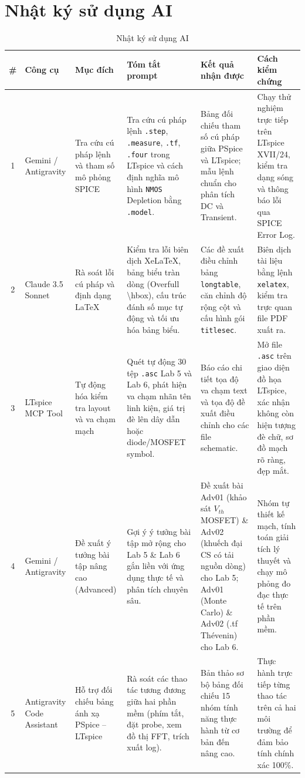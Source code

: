 \documentclass[12pt,a4paper]{article}
\newcommand{\hc}[1]{\cellcolor{navy}\color{white}\sffamily\bfseries\small #1}
\begin{document}
\section{Nhật ký sử dụng AI}

\begin{table}[H]\centering\small
\caption{Nhật ký sử dụng AI}\label{tab:ai_log}
\renewcommand{\arraystretch}{1.3}
\setlength{\tabcolsep}{3.5pt}
\begin{tabular}{|c|p{1.9cm}|p{2.5cm}|p{2.9cm}|p{2.9cm}|p{2.6cm}|}
\hline
\hc{\#} & \hc{Công cụ} & \hc{Mục đích} & \hc{Tóm tắt prompt} & \hc{Kết quả nhận được} & \hc{Cách kiểm chứng}\\ \hline
1 & Gemini / Antigravity & Tra cứu cú pháp lệnh và tham số mô phỏng SPICE & Tra cứu cú pháp lệnh \texttt{.step}, \texttt{.measure}, \texttt{.tf}, \texttt{.four} trong LTspice và cách định nghĩa mô hình \texttt{NMOS} Depletion bằng \texttt{.model}. & Bảng đối chiếu tham số cú pháp giữa PSpice và LTspice; mẫu lệnh chuẩn cho phân tích DC và Transient. & Chạy thử nghiệm trực tiếp trên LTspice XVII/24, kiểm tra dạng sóng và thông báo lỗi qua SPICE Error Log. \\ \hline
2 & Claude 3.5 Sonnet & Rà soát lỗi cú pháp và định dạng LaTeX & Kiểm tra lỗi biên dịch XeLaTeX, bảng biểu tràn dòng (Overfull \textbackslash hbox), cấu trúc đánh số mục tự động và tối ưu hóa bảng biểu. & Các đề xuất điều chỉnh bảng \texttt{longtable}, căn chỉnh độ rộng cột và cấu hình gói \texttt{titlesec}. & Biên dịch tài liệu bằng lệnh \texttt{xelatex}, kiểm tra trực quan file PDF xuất ra. \\ \hline
3 & LTspice MCP Tool & Tự động hóa kiểm tra layout và va chạm mạch & Quét tự động 30 tệp \texttt{.asc} Lab 5 và Lab 6, phát hiện va chạm nhãn tên linh kiện, giá trị đè lên dây dẫn hoặc diode/MOSFET symbol. & Báo cáo chi tiết tọa độ va chạm text và tọa độ đề xuất điều chỉnh cho các file schematic. & Mở file \texttt{.asc} trên giao diện đồ họa LTspice, xác nhận không còn hiện tượng đè chữ, sơ đồ mạch rõ ràng, đẹp mắt. \\ \hline
4 & Gemini / Antigravity & Đề xuất ý tưởng bài tập nâng cao (Advanced) & Gợi ý ý tưởng bài tập mở rộng cho Lab 5 \& Lab 6 gắn liền với ứng dụng thực tế và phân tích chuyên sâu. & Đề xuất bài Adv01 (khảo sát $V_{th}$ MOSFET) \& Adv02 (khuếch đại CS có tải nguồn dòng) cho Lab 5; Adv01 (Monte Carlo) \& Adv02 (.tf Thévenin) cho Lab 6. & Nhóm tự thiết kế mạch, tính toán giải tích lý thuyết và chạy mô phỏng đo đạc thực tế trên phần mềm. \\ \hline
5 & Antigravity Code Assistant & Hỗ trợ đối chiếu bảng ánh xạ PSpice -- LTspice & Rà soát các thao tác tương đương giữa hai phần mềm (phím tắt, đặt probe, xem đồ thị FFT, trích xuất log). & Bản thảo sơ bộ bảng đối chiếu 15 nhóm tính năng thực hành từ cơ bản đến nâng cao. & Thực hành trực tiếp từng thao tác trên cả hai môi trường để đảm bảo tính chính xác 100\%. \\ \hline
\end{tabular}
\end{table}
\end{document}
